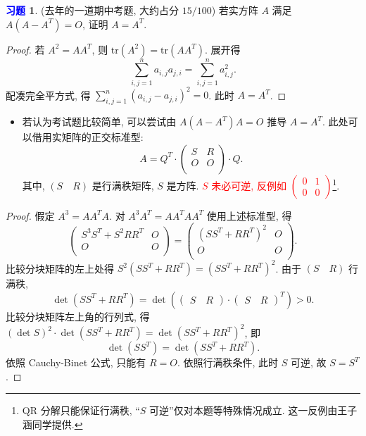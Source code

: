 \documentclass[11pt]{ctexart}
\theoremstyle{definition}
\numberwithin{equation}{section}
\theoremstyle{definition}
\newtheorem{exercise}{\textcolor{blue}{习题}}
\theoremstyle{remark}
\begin{document}
\begin{exercise}
    (去年的一道期中考题, 大约占分 $15/100$) 若实方阵 $A$ 满足 $A(A-A^T)=O$, 证明 $A=A^T$. 
    \begin{proof}
        若 $A^2=AA^T$, 则 $\mathrm{tr}(A^2)=\mathrm{tr}(AA^T)$. 展开得 
        \begin{equation}
            \sum_{i,j=1}^n a_{i,j}a_{j,i}=\sum_{i,j=1}^n a_{i,j}^2. 
        \end{equation}
        配凑完全平方式, 得 $\sum_{i,j=1}^n(a_{i,j}-a_{j,i})^2=0$. 此时 $A=A^T$. 
    \end{proof}
    \begin{itemize}
        \item 若认为考试题比较简单, 可以尝试由 $A(A-A^T)A=O$ 推导 $A=A^T$. 此处可以借用实矩阵的正交标准型: 
\begin{equation}
    A=Q^T\cdot \begin{pmatrix} S&R\\O&O\\\end{pmatrix}\cdot Q.
\end{equation}
        其中, $(S\quad R)$ 是行满秩矩阵, $S$ 是方阵. \textcolor{red}{$S$ 未必可逆, 反例如 $\begin{pmatrix}0 & 1\\0 & 0 \end{pmatrix}$}\footnote{QR 分解只能保证行满秩, ``$S$ 可逆''仅对本题等特殊情况成立. 这一反例由王子涵同学提供.}. 
    \end{itemize}
    \begin{proof}
        假定 $A^3=AA^TA$. 对 $A^3A^T=AA^TAA^T$ 使用上述标准型, 得
        \begin{equation}
            \begin{pmatrix} S^3S^T+S^2RR^T&O\\O&O\\\end{pmatrix}=\begin{pmatrix} (SS^T+RR^T)^2&O\\O&O\\\end{pmatrix}. 
        \end{equation}
        比较分块矩阵的左上处得 $S^2(SS^T+RR^T)=(SS^T+RR^T)^2$. 由于 $(S\quad R)$ 行满秩, 
        \begin{equation}
            \det (SS^T+RR^T)=\det \left(\begin{pmatrix} S\quad R\end{pmatrix}\cdot \begin{pmatrix} S\quad R\end{pmatrix}^T\right) >0. 
        \end{equation}
        比较分块矩阵左上角的行列式, 得 $(\det S)^2\cdot \det (SS^T+RR^T)=\det (SS^T+RR^T)^2$, 即
        \begin{equation}
            \det (SS^T)=\det (SS^T+RR^T).
        \end{equation}
        依照 Cauchy-Binet 公式, 只能有 $R=O$. 依照行满秩条件, 此时 $S$ 可逆, 故 $S=S^T$. 
    \end{proof}
\end{exercise}
\end{document}
